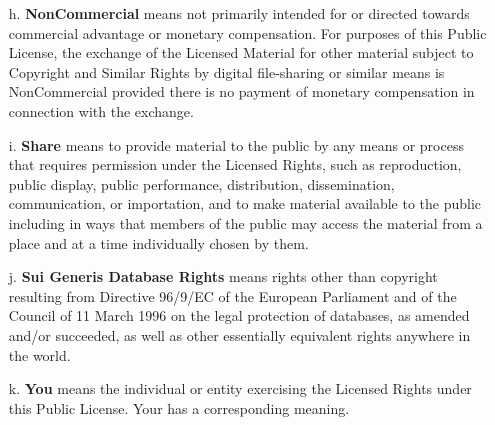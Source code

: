 \begin{itemize}
\item[h.] \textbf{NonCommercial} means not primarily intended for or directed towards commercial advantage or monetary compensation. For purposes of this Public License, the exchange of the Licensed Material for other material subject to Copyright and Similar Rights by digital file-sharing or similar means is NonCommercial provided there is no payment of monetary compensation in connection with the exchange.

\item[i.] \textbf{Share} means to provide material to the public by any means or process that requires permission under the Licensed Rights, such as reproduction, public display, public performance, distribution, dissemination, communication, or importation, and to make material available to the public including in ways that members of the public may access the material from a place and at a time individually chosen by them.

\item[j.] \textbf{Sui Generis Database Rights} means rights other than copyright resulting from Directive 96/9/EC of the European Parliament and of the Council of 11 March 1996 on the legal protection of databases, as amended and/or succeeded, as well as other essentially equivalent rights anywhere in the world.

\item[k.] \textbf{You} means the individual or entity exercising the Licensed Rights under this Public License. Your has a corresponding meaning.
\end{itemize}

